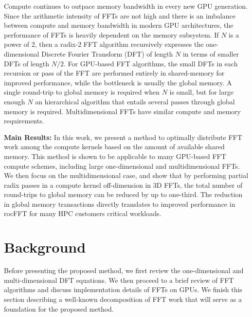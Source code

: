 \documentclass{gtac}
\theoremstyle{problemstyle}
\begin{document}
Compute continues to outpace memory bandwidth in every new GPU
generation. Since the arithmetic intensity of FFTs are not high and
there is an imbalance between compute and memory bandwidth in modern GPU
architectures, the performance of FFTs is heavily dependent on the
memory subsystem. If $N$ is a power of 2, then a radix-$2$ FFT
algorithm recursively expresses the one-dimensional Discrete Fourier
Transform (DFT) of length $N$ in terms of smaller DFTs of length
$N/2$. For GPU-based FFT algorithms, the small DFTs in each recursion
or pass of the FFT are performed entirely in shared-memory for
improved performance, while the bottleneck is usually the global
memory. A single round-trip to global memory is required when $N$ is
small, but for large enough $N$ an hierarchical algorithm that entails
several passes through global memory is required. Multidimensional
FFTs have similar compute and memory requirements.

\textbf{Main Results:} In this work, we present a method to optimally
distribute FFT work among the compute kernels based on the amount of
available shared memory. This method is shown to be applicable to many
GPU-based FFT compute schemes, including large one-dimensional and
multidimensional FFTs. We then focus on the multidimensional case, and
show that by performing partial radix passes in a compute kernel
off-dimension in 3D FFTs, the total number of
round-trips to global memory can be reduced by up to one-third. The
reduction in global memory transactions directly translates to
improved performance in rocFFT for many HPC customers critical
workloads.

\section{Background}

Before presenting the proposed method, we first review the one-dimensional and multi-dimensional DFT equations. We then proceed to a brief review of FFT algorithms and discuss implementation details of FFTs on GPUs. We finish this section describing a well-known decomposition of FFT work that will serve as a foundation for the proposed method. 
\end{document}
